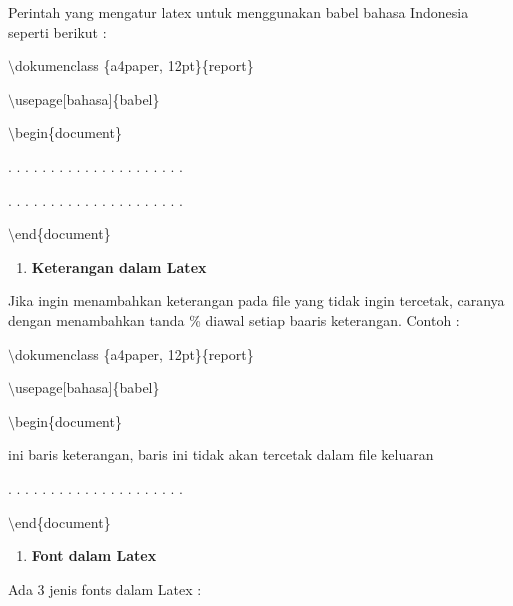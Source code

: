 Perintah yang mengatur latex untuk menggunakan babel bahasa Indonesia seperti berikut :

$\setminus$dokumenclass \{a4paper, 12pt\}\{report\}\par \vspace{12pt}

$\setminus$usepage$[$bahasa$]$\{babel\}\par \vspace{12pt}

$\setminus$begin\{document\}\par \vspace{12pt}

. . . . . . . . . . . . . . . . . . . . .

. . . . . . . . . . . . . . . . . . . . .
\par \vspace{12pt}
$\setminus$end\{document\}

\begin{enumerate}
\setcounter{enumi}{\thenumberedCntB}
\item \textbf{Keterangan dalam Latex}
\setcounter{numberedCntB}{\theenumi}
\end{enumerate}
\hspace{0,5in}Jika ingin menambahkan keterangan pada file yang tidak ingin tercetak, caranya dengan menambahkan tanda \% diawal setiap baaris keterangan. Contoh :\par \vspace{12pt}

$\setminus$dokumenclass \{a4paper, 12pt\}\{report\}\par \vspace{12pt}

$\setminus$usepage$[$bahasa$]$\{babel\}\par \vspace{12pt}

$\setminus$begin\{document\}\par \vspace{12pt}

ini baris keterangan, baris ini tidak akan tercetak dalam file 
keluaran

. . . . . . . . . . . . . . . . . . . . .\par \vspace{12pt}

$\setminus$end\{document\}

\begin{enumerate}
\setcounter{enumi}{\thenumberedCntB}
\item \textbf{Font dalam Latex}
\setcounter{numberedCntB}{\theenumi}
\end{enumerate}
Ada 3 jenis fonts dalam Latex :

